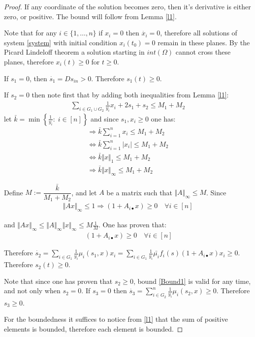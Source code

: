 \documentclass[3p,times]{article}
\begin{document}
\begin{proof}
	If any coordinate of the solution becomes zero, then it's derivative is either zero, or positive. The bound will follow from Lemma \ref{l1}.
	
	Note that for any $i \in \{1,\dots, n\} $ if $x_i = 0$ then $\dot{x_{i}} = 0$, therefore all solutions of system \eqref{system} with initial condition $x_i(t_0) = 0$ remain in these planes. By the Picard Lindeloff theorem a solution starting in $int(\Omega)$ cannot cross these planes, therefore $x_i(t)\geq 0$ for $t \geq 0$.
	
	If $s_1 = 0$, then $\dot{s_1} = Ds_{in} > 0$. Therefore $s_1(t) \geq 0$.
	
	If $s_2 = 0$ then note first that by adding both inequalities from Lemma \eqref{l1}:
	\begin{align*}
	\sum \limits_{i \in G_1 \cup G_2}  \frac{1}{y_i} x_i + 2s_1 + s_2 \leq M_1 + M_2 
	\end{align*}
	let $\bar{k} = \min \left\{ \frac{1}{y_i}  : \; i\in [n] \right \}$ and since $s_1,x_i \geq 0$ one has:
	\begin{align*}
	\Rightarrow \bar{k} \sum  \limits_{i = 1}^{n}   x_i  \leq M_1 + M_2  \\
	\Leftrightarrow \bar{k} \sum  \limits_{i = 1}^{n}   \vert x_i \vert  \leq M_1 + M_2  \\
	\Leftrightarrow \bar{k} \Vert x \Vert_1  \leq M_1 + M_2  \\
	\Rightarrow   \bar{k} \Vert x \Vert_{\infty} \leq M_1 + M_2
	\end{align*}
	
	
	Define $M := \dfrac{\bar{k}}{M_1 + M_2}$, and let $A$ be a matrix such that $\Vert A \Vert_{\infty} \leq M$. Since
	\begin{align*} \Vert Ax \Vert_{\infty} \leq 1 \Rightarrow   (1 + A_{i\bullet}x) \geq 0 \quad \forall i \in [n]
	\end{align*}
	
	and $\Vert Ax \Vert_{\infty} \leq \Vert A \Vert_{\infty} \Vert x\Vert_{\infty} \leq M \frac{1}{M}$. One has proven that:
	\begin{align}
	\label{Bound1}  \;   (1 + A_{i\bullet}x) \geq 0  \quad \forall i \in [n]
	\end{align} 
	
	Therefore $\dot{s_2} = \displaystyle \sum \limits_{i \in G_1 } \frac{1}{y_i}\mu_i(s_1,x)x_i =  \sum \limits_{i \in G_1 } \frac{1}{y_i}\bar{\mu_i}f_i(s)(1+A_{i \bullet }x)x_i \geq 0$. Therefore $s_2(t) \geq 0$.
	
	Note that since one has proven that $s_2 \geq 0$, bound \eqref{Bound1} is valid for any time, and not only when $s_2 = 0$. 
	If $s_3 = 0$ then $\dot{s_3} = \sum \limits_{i \in G_2 }^{n}\frac{1}{y_i}\mu_i(s_2,x)\geq 0$. Therefore $s_3 \geq 0$.
	
	For the boundedness it suffices to notice from \cref{l1} that the sum of positive elements is bounded, therefore each element is bounded.
\end{proof}
\end{document}
